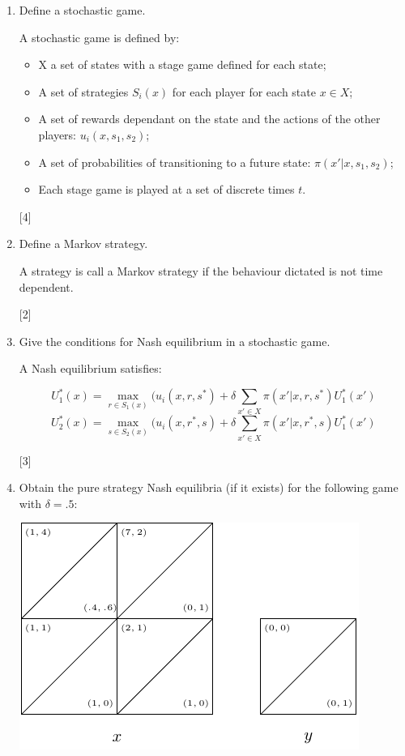 \documentclass[12pt,a4paper]{article}
\begin{document}
\begin{enumerate}
\begin{enumerate}
        \item Define a stochastic game.

            A stochastic game is defined by:

            \begin{itemize}
            \item X a set of states with a stage game defined for each state;
            \item A set of strategies $S_i(x)$ for each player for each state $x\in X$;
            \item A set of rewards dependant on the state and the actions of the other players: $u_i(x,s_1,s_2)$;
            \item A set of probabilities of transitioning to a future state: $\pi(x'|x,s_1,s_2)$;
            \item Each stage game is played at a set of discrete times $t$.
            \end{itemize}

        \hfill[4]

        \item Define a Markov strategy.

            A strategy is call a Markov strategy if the behaviour dictated is not time dependent.

        \hfill[2]

        \item Give the conditions for Nash equilibrium in a stochastic game.

            A Nash equilibrium satisfies:

            $$U_1^*(x)=\max_{r\in S_1(x)}(u_i(x,r,s^*)+\delta\sum_{x'\in X}\pi(x'|x,r,s^*)U_1^*(x')$$
            $$U_2^*(x)=\max_{s\in S_2(x)}(u_i(x,r^*,s)+\delta\sum_{x'\in X}\pi(x'|x,r^*,s)U_1^*(x')$$

        \hfill[3]

        \item Obtain the pure strategy Nash equilibria (if it exists) for the following game with \(\delta=.5\):

        \begin{center}
            \includegraphics[width=.8\textwidth]{images/mock-img04.pdf}
        \end{center}


\end{enumerate}
\end{enumerate}
\end{document}
